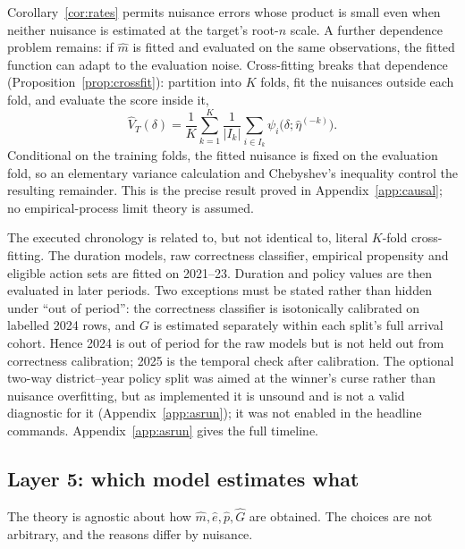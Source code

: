 \documentclass[11pt,a4paper]{article}
\theoremstyle{plain}
\theoremstyle{definition}
\theoremstyle{remark}
\begin{document}
Corollary~\ref{cor:rates} permits nuisance errors whose product is small even when neither
nuisance is estimated at the target's root-$n$ scale. A further dependence problem remains: if
$\hat m$ is fitted and evaluated on the same observations, the fitted function can adapt to the
evaluation noise. Cross-fitting breaks that dependence (Proposition~\ref{prop:crossfit}):
partition into $K$ folds, fit the nuisances outside each fold, and evaluate the score inside it,
\begin{equation}
\hat V_T(\delta)=\frac1K\sum_{k=1}^K\frac1{|I_k|}\sum_{i\in I_k}\psi_i\bigl(\delta;\hat\eta^{(-k)}\bigr).
\label{eq:crossfit}
\end{equation}
Conditional on the training folds, the fitted nuisance is fixed on the evaluation fold, so an
elementary variance calculation and Chebyshev's inequality control the resulting remainder.
This is the precise result proved in Appendix~\ref{app:causal}; no empirical-process limit
theory is assumed.

The executed chronology is related to, but not identical to, literal $K$-fold cross-fitting.
The duration models, raw correctness classifier, empirical propensity and eligible action sets
are fitted on 2021--23. Duration and policy values are then evaluated in later periods. Two
exceptions must be stated rather than hidden under ``out of period'': the correctness classifier
is isotonically calibrated on labelled 2024 rows, and $G$ is estimated separately within each
split's full arrival cohort. Hence 2024 is out of period for the raw models but is not held out
from correctness calibration; 2025 is the temporal check after calibration. The optional
two-way district--year policy split was aimed at the winner's curse rather than nuisance
overfitting, but as implemented it is unsound and is not a valid diagnostic for it
(Appendix~\ref{app:asrun}); it was not enabled in the headline commands. Appendix~\ref{app:asrun} gives the full timeline.

\subsection{Layer 5: which model estimates what}\label{sec:models}

The theory is agnostic about how $\hat m,\hat e,\hat p,\hat G$ are obtained. The choices are not
arbitrary, and the reasons differ by nuisance.
\end{document}

